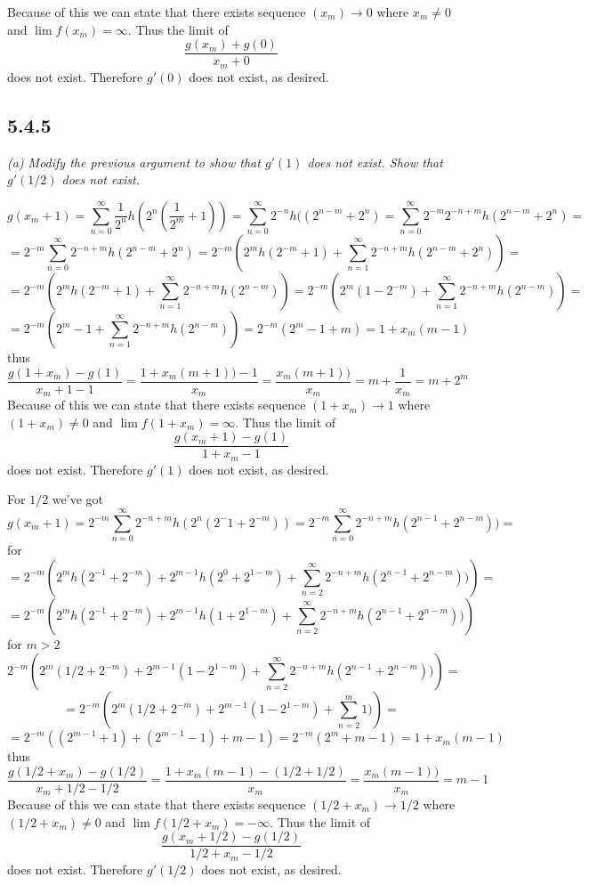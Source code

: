\documentclass[11pt,oneside,titlepage]{book}
\begin{document}
Because of this we can state that there exists sequence $(x_m) \to 0$
where $x_m \neq 0$ and $\lim{f(x_m) } = \infty$. Thus the limit of 
$$\frac{g(x_m) + g(0)}{x_m + 0}$$
does not exist. Therefore $g'(0)$ does not exist, as desired.

\subsection*{5.4.5}
\textit{(a) Modify the previous argument to show that $g'(1)$ does not exist.
  Show that $g'(1/2)$ does not exist.}

$$g(x_m + 1) = \sum_{n = 0}^{\infty}{\frac{1}{2^n}h(2^n (\frac{1}{2^m} + 1))}
= 
\sum_{n = 0}^{\infty}{2^{-n}h((2^{n - m} + 2^n)} =
\sum_{n = 0}^{\infty}{2^{-m}2^{-n + m} h(2^{n - m} + 2^n)} =$$
$$ = 2^{-m} \sum_{n = 0}^{\infty}{2^{-n + m} h(2^{n - m} + 2^n)} =
2^{-m} \left(2^m h(2^{-m} + 1) +
  \sum_{n = 1}^{\infty}{2^{-n + m} h(2^{n - m} + 2^n)}\right) = $$
$$ = 2^{-m} \left(2^m h(2^{-m} + 1) +
  \sum_{n = 1}^{\infty}{2^{-n + m} h(2^{n - m} )}\right) =
2^{-m} \left(2^m (1 - 2^{-m}) +
  \sum_{n = 1}^{\infty}{2^{-n + m} h(2^{n - m} )}\right) =
$$
$$
=  2^{-m} \left(2^m - 1 + 
  \sum_{n = 1}^{\infty}{2^{-n + m} h(2^{n - m} )}\right) =
2^{-m} \left(2^m - 1 + m\right) =  1 + x_m(m - 1)
$$
thus
$$\frac{g(1 + x_m) - g(1)}{x_m + 1 - 1} =
\frac{1 + x_m(m + 1)) - 1}{x_m } =
\frac{x_m(m + 1))}{x_m } =
m + \frac{1}{x_m } = m + 2^m$$
Because of this we can state that there exists sequence $(1 + x_m) \to 1$
where $(1 + x_m) \neq 0$ and $\lim{f(1 + x_m) } = \infty$. Thus the limit of 
$$\frac{g(x_m + 1) - g(1)}{1 + x_m - 1}$$
does not exist. Therefore $g'(1)$ does not exist, as desired.

For $1/2$ we've got
$$g(x_m + 1) =
2^{-m}\sum_{n = 0}^{\infty}{2^{-n + m} h(2^{n}(2^-1 + 2^{-m}))} =
2^{-m}\sum_{n = 0}^{\infty}{2^{-n + m} h(2^{n - 1} + 2^{n - m}))} =
$$
for 
$$
=
2^{-m}\left(2^m h(2^{-1} + 2^{-m}) + 2^{m - 1}h(2^0 + 2^{1 - m}) + \sum_{n = 2}^{\infty}{2^{-n + m} h(2^{n - 1} + 2^{n - m}))}\right) =
$$
$$
=
2^{-m}\left(2^m h(2^{-1} + 2^{-m}) + 2^{m - 1}h(1 + 2^{1 - m}) + \sum_{n = 2}^{\infty}{2^{-n + m} h(2^{n - 1} + 2^{n - m}))}\right)
$$
for $m > 2$
$$
2^{-m}\left(2^m (1/2 + 2^{-m}) + 2^{m - 1}(1 - 2^{1 - m}) + \sum_{n = 2}^{\infty}{2^{-n + m} h(2^{n - 1} + 2^{n - m}))}\right) =
$$
$$=
2^{-m}\left(2^m (1/2 + 2^{-m}) + 2^{m - 1}(1 - 2^{1 - m}) + \sum_{n = 2}^{m}{1)}\right) =
$$
$$=
2^{-m}\left((2^{m - 1} + 1) + (2^{m - 1} - 1) + m - 1\right) =
2^{-m}\left(2^{m}  + m - 1\right) = 1 + x_m\left( m - 1\right)
$$
thus
$$\frac{g(1/2 + x_m) - g(1/2)}{x_m + 1/2 - 1/2} =
\frac{1 + x_m( m - 1) - (1/2 + 1/2)}{x_m} =
\frac{x_m(m - 1))}{x_m } =
m - 1$$
Because of this we can state that there exists sequence $(1/2 + x_m) \to 1/2$
where $(1/2 + x_m) \neq 0$ and $\lim{f(1/2 + x_m) } = -\infty$.
Thus the limit of 
$$\frac{g(x_m + 1/2) - g(1/2)}{1/2 + x_m - 1/2}$$
does not exist. Therefore $g'(1/2)$ does not exist, as desired.
\end{document}
